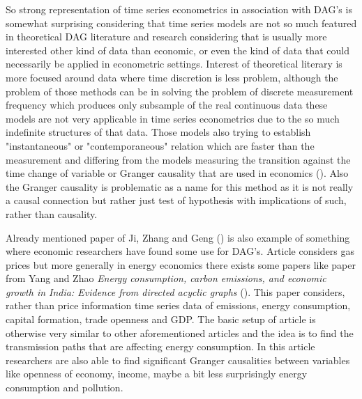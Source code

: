 \documentclass[main=english,12pt,a4paper,pdftex,econ,utf8]{aaltothesis}
\begin{document}
So strong representation of time series econometrics in association with DAG's is somewhat surprising considering that time series models are not so much featured in theoretical DAG literature and research considering that is usually more interested other kind of data than economic, or even the kind of data that could necessarily be applied in econometric settings. Interest of theoretical literary is more focused around data where time discretion is less problem, although the problem of those methods can be in solving the problem of discrete measurement frequency which produces only subsample of the real continuous data these models are not very applicable in time series econometrics due to the so much indefinite structures of that data. Those models also trying to establish "instantaneous" or "contemporaneous" relation which are faster than the measurement and differing from the models measuring the transition against the time change of variable or Granger causality that are used in economics (\cite{Hyttinen2017}). Also the Granger causality is problematic as a name for this method as it is not really a causal connection but rather just test of hypothesis with implications of such, rather than causality.

Already mentioned paper of Ji, Zhang and Geng (\cite{Ji2018}) is also example of something where economic researchers have found some use for DAG's. Article considers gas prices but more generally in energy economics there exists some papers like paper from Yang and Zhao \textit{Energy consumption, carbon emissions, and economic growth in India: Evidence from directed acyclic graphs} (\cite{Yang2014}). This paper considers, rather than price information time series data of emissions, energy consumption, capital formation, trade openness and GDP. The basic setup of article is otherwise very similar to other aforementioned articles and the idea is to find the transmission paths that are affecting energy consumption. In this article researchers are also able to find significant Granger causalities between variables like openness of economy, income, maybe a bit less surprisingly energy consumption and pollution.
\end{document}
